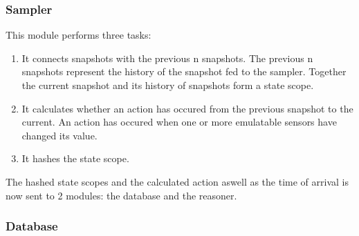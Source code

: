 \subsubsection{Sampler}
This module performs three tasks:

\begin{enumerate}
\item It connects snapshots with the previous n snapshots. The previous n snapshots represent the history of the snapshot fed to the sampler. Together the current snapshot and its history of snapshots form a state scope.
\item It calculates whether an action has occured from the previous snapshot to the current. An action has occured when one or more emulatable sensors have changed its value.
\item It hashes the state scope.
\end{enumerate}

The hashed state scopes and the calculated action aswell as the time of arrival is now sent to 2 modules: the database and the reasoner.

\subsubsection{Database}
